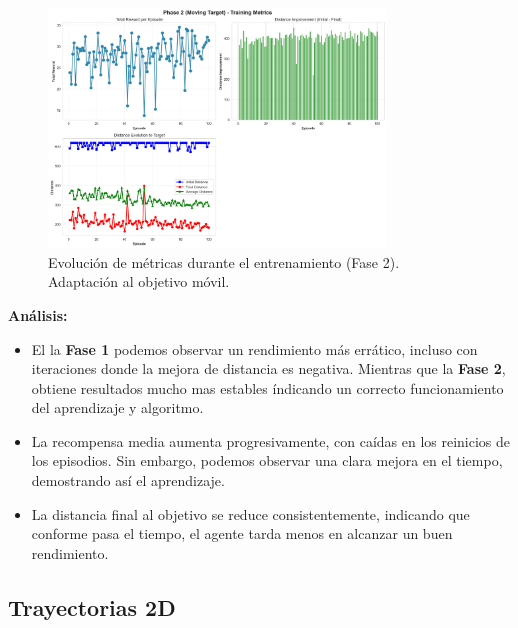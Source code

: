 \documentclass[12pt,a4paper]{article}
\begin{document}
\begin{figure}[H]
    \centering
    \includegraphics[width=0.8\textwidth]{logs/episode_metrics_phase2.png}
    \caption{Evolución de métricas durante el entrenamiento (Fase 2). Adaptación al objetivo móvil.}
    \label{fig:training_metrics_phase2}
\end{figure}

\textbf{Análisis:}
\begin{itemize}
    \item El la \textbf{Fase 1} podemos observar un rendimiento más errático, incluso con iteraciones donde la mejora de distancia es negativa. Mientras que la \textbf{Fase 2}, obtiene resultados mucho mas estables índicando un correcto funcionamiento del aprendizaje y algoritmo.
    \item La recompensa media aumenta progresivamente, con caídas en los reinicios de los episodios. Sin embargo, podemos observar una clara mejora en el tiempo, demostrando así el aprendizaje.
    \item La distancia final al objetivo se reduce consistentemente, indicando que conforme pasa el tiempo, el agente tarda menos en alcanzar un buen rendimiento.
\end{itemize}

\subsection{Trayectorias 2D}
\end{document}

